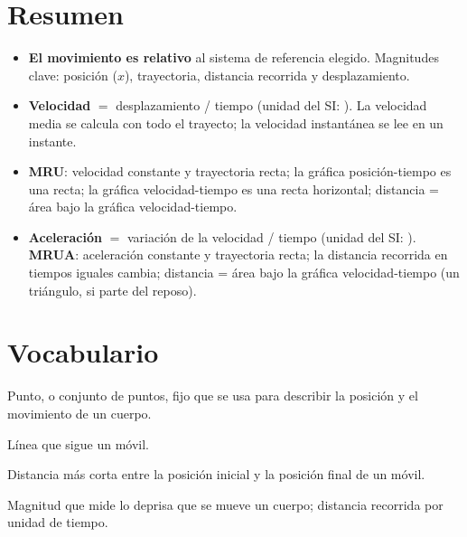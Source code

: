 
\section*{Resumen}

\begin{itemize}
    \item \textbf{El movimiento es relativo} al sistema de referencia elegido. Magnitudes clave: posición (\(x\)), trayectoria, distancia recorrida y desplazamiento.
    \item \textbf{Velocidad} \(= \) desplazamiento / tiempo (unidad del SI: \unit{\mps}). La velocidad media se calcula con todo el trayecto; la velocidad instantánea se lee en un instante.
    \item \textbf{MRU}: velocidad constante y trayectoria recta; la gráfica posición-tiempo es una recta; la gráfica velocidad-tiempo es una recta horizontal; distancia = área bajo la gráfica velocidad-tiempo.
    \item \textbf{Aceleración} \(=\) variación de la velocidad / tiempo (unidad del SI: \unit{\mpss}). \textbf{MRUA}: aceleración constante y trayectoria recta; la distancia recorrida en tiempos iguales cambia; distancia = área bajo la gráfica velocidad-tiempo (un triángulo, si parte del reposo).
\end{itemize}

\section{Vocabulario}

\begin{vocabulary}
    Punto, o conjunto de puntos, fijo que se usa para describir la posición y el movimiento de un cuerpo.
\end{vocabulary}

\begin{vocabulary}
    Línea que sigue un móvil.
\end{vocabulary}

\begin{vocabulary}
    Distancia más corta entre la posición inicial y la posición final de un móvil.
\end{vocabulary}

\begin{vocabulary}
    Magnitud que mide lo deprisa que se mueve un cuerpo; distancia recorrida por unidad de tiempo.
\end{vocabulary}


